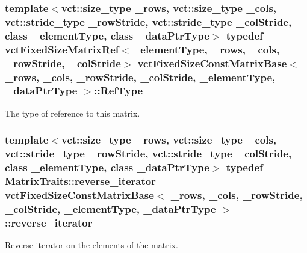 \subsubsection[{Ref\+Type}]{\setlength{\rightskip}{0pt plus 5cm}template$<$vct\+::size\+\_\+type \+\_\+rows, vct\+::size\+\_\+type \+\_\+cols, vct\+::stride\+\_\+type \+\_\+row\+Stride, vct\+::stride\+\_\+type \+\_\+col\+Stride, class \+\_\+element\+Type, class \+\_\+data\+Ptr\+Type$>$ typedef {\bf vct\+Fixed\+Size\+Matrix\+Ref}$<$\+\_\+element\+Type, \+\_\+rows, \+\_\+cols, \+\_\+row\+Stride, \+\_\+col\+Stride$>$ {\bf vct\+Fixed\+Size\+Const\+Matrix\+Base}$<$ \+\_\+rows, \+\_\+cols, \+\_\+row\+Stride, \+\_\+col\+Stride, \+\_\+element\+Type, \+\_\+data\+Ptr\+Type $>$\+::{\bf Ref\+Type}}\label{classvct_fixed_size_const_matrix_base_a9745538b98120d767fe2b9a9ba984e80}
The type of reference to this matrix. \hypertarget{classvct_fixed_size_const_matrix_base_a7611e666969b09bd846c46a1a85401b0}{}
\subsubsection[{reverse\+\_\+iterator}]{\setlength{\rightskip}{0pt plus 5cm}template$<$vct\+::size\+\_\+type \+\_\+rows, vct\+::size\+\_\+type \+\_\+cols, vct\+::stride\+\_\+type \+\_\+row\+Stride, vct\+::stride\+\_\+type \+\_\+col\+Stride, class \+\_\+element\+Type, class \+\_\+data\+Ptr\+Type$>$ typedef {\bf Matrix\+Traits\+::reverse\+\_\+iterator} {\bf vct\+Fixed\+Size\+Const\+Matrix\+Base}$<$ \+\_\+rows, \+\_\+cols, \+\_\+row\+Stride, \+\_\+col\+Stride, \+\_\+element\+Type, \+\_\+data\+Ptr\+Type $>$\+::{\bf reverse\+\_\+iterator}}\label{classvct_fixed_size_const_matrix_base_a7611e666969b09bd846c46a1a85401b0}
Reverse iterator on the elements of the matrix. \hypertarget{classvct_fixed_size_const_matrix_base_a2ce1bc7d955f66d28462cb34b62d69b7}{}

